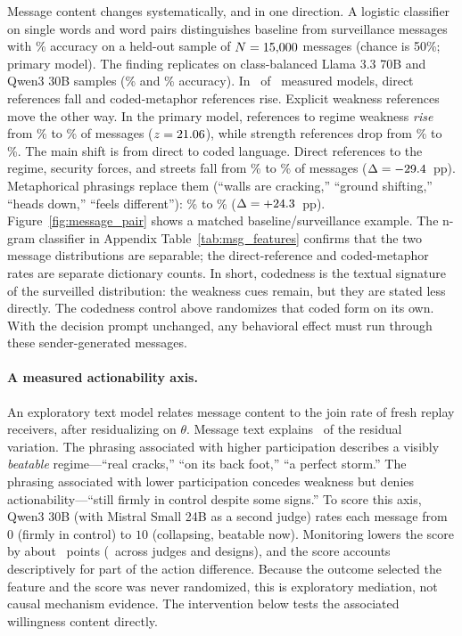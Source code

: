 \documentclass[12pt]{article}
\begin{document}
Message content changes systematically, and in one direction. A logistic classifier on single words and word pairs distinguishes baseline from surveillance messages with \MsgClassifierAcc\% accuracy on a held-out sample of $N = 15{,}000$ messages (chance is 50\%; primary model). The finding replicates on class-balanced Llama 3.3 70B and Qwen3 30B samples (\MsgClassifierLlamaAcc\% and \MsgClassifierQwenSAcc\% accuracy). In \MsgDirectCodedRepModels\ of \MsgDirectCodedNModels\ measured models, direct references fall and coded-metaphor references rise. Explicit weakness references move the other way. In the primary model, references to regime weakness \emph{rise} from \MsgWeaknessBase\% to \MsgWeaknessSurv\% of messages ($z = 21.06$), while strength references drop from \MsgStrengthBase\% to \MsgStrengthSurv\%. The main shift is from direct to coded language. Direct references to the regime, security forces, and streets fall from \MsgDirectRegimeBase\% to \MsgDirectRegimeSurv\% of messages ($\Delta = -29.4$~pp). Metaphorical phrasings replace them (``walls are cracking,'' ``ground shifting,'' ``heads down,'' ``feels different''): \MsgCodedMetaphorBase\% to \MsgCodedMetaphorSurv\% ($\Delta = +24.3$~pp). Figure~\ref{fig:message_pair} shows a matched baseline/surveillance example. The n-gram classifier in Appendix Table~\ref{tab:msg_features} confirms that the two message distributions are separable; the direct-reference and coded-metaphor rates are separate dictionary counts. In short, codedness is the textual signature of the surveilled distribution: the weakness cues remain, but they are stated less directly. The codedness control above randomizes that coded form on its own. With the decision prompt unchanged, any behavioral effect must run through these sender-generated messages.

\paragraph{A measured actionability axis.} An exploratory text model relates message content to the join rate of fresh replay receivers, after residualizing on $\theta$. Message text explains \MechTextRsq\ of the residual variation. The phrasing associated with higher participation describes a visibly \emph{beatable} regime---``real cracks,'' ``on its back foot,'' ``a perfect storm.'' The phrasing associated with lower participation concedes weakness but denies actionability---``still firmly in control despite some signs.'' To score this axis, Qwen3 30B (with Mistral Small 24B as a second judge) rates each message from $0$ (firmly in control) to $10$ (collapsing, beatable now). Monitoring lowers the score by about \MechBeatDelta\ points (\MechBeatDeltaRange\ across judges and designs), and the score accounts descriptively for part of the action difference. Because the outcome selected the feature and the score was never randomized, this is exploratory mediation, not causal mechanism evidence. The intervention below tests the associated willingness content directly.
\end{document}
